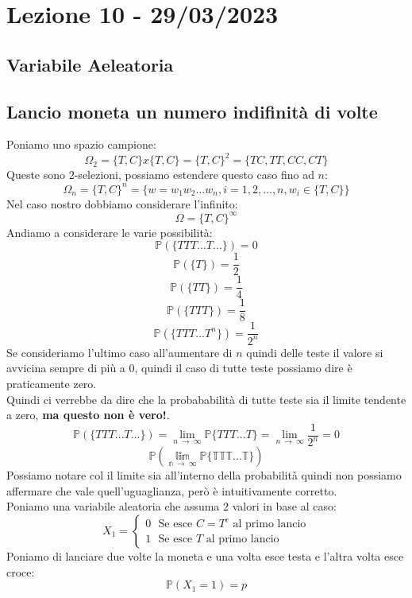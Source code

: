 \section{Lezione 10 - 29/03/2023}

\subsection{Variabile Aeleatoria}

\subsection{Lancio moneta un numero indifinità di volte}
Poniamo uno spazio campione: 
$$\Omega_2 = \{T,C\} x \{T,C\} = \{T,C\}^2 = \{TC,TT,CC,CT\}$$
Queste sono $2$-selezioni, possiamo estendere questo caso fino ad $n$:
$$\Omega_n = \{T,C\}^n = \{ w = w_1w_2...w_n, i=1,2,...,n, w_i \in \{T,C\} \}$$
Nel caso nostro dobbiamo considerare l'infinito:
$$ \Omega = \{T,C\}^{\infty} $$
Andiamo a considerare le varie possibilità:
$$ \mathbb{P}(\{TTT...T...\}) = 0 $$
$$ \mathbb{P}(\{T\}) = \frac{1}{2} $$
$$ \mathbb{P}(\{TT\}) = \frac{1}{4} $$
$$ \mathbb{P}(\{TTT\}) = \frac{1}{8} $$
$$ \mathbb{P}(\{TTT...T^n\}) = \frac{1}{2^n} $$
Se consideriamo l'ultimo caso all'aumentare di $n$ quindi delle teste il valore si avvicina sempre di più a $0$, quindi il caso di tutte teste possiamo dire è praticamente zero.\\
Quindi ci verrebbe da dire che la probababilità di tutte teste sia il limite tendente a zero, \textbf{ma questo non è vero!}.
$$ \mathbb{P}(\{TTT...T...\}) = \displaystyle\lim_{n\ \rightarrow\ \infty}\mathbb{P}\{TTT...T\} = \displaystyle\lim_{n\ \rightarrow\ \infty} \frac{1}{2^n} = 0 $$
$$ \mathbb{P(\displaystyle\lim_{n\ \rightarrow\ \infty}\mathbb{P}\{TTT...T\})} $$
Possiamo notare col il limite sia all'interno della probabilità quindi non possiamo affermare che vale quell'uguaglianza, però è intuitivamente corretto.\\
Poniamo una variabile aleatoria che assuma $2$ valori in base al caso:
\begin{equation*}
X_1 = 
\begin{cases}
0 \: \: \: \text{Se esce $C=T^c$ al primo lancio} \\
1 \: \: \: \text{Se esce $T$ al primo lancio}  
\end{cases}
\end{equation*}
Poniamo di lanciare due volte la moneta e una volta esce testa e l'altra volta esce croce:
$$ \mathbb{P}(X_1=1) = \textit{p} $$
